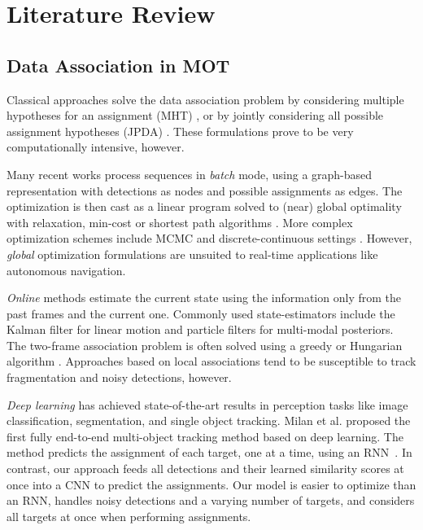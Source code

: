 \documentclass[letterpaper, 10 pt, conference]{ieeeconf}
\begin{document}
\section{Literature Review}
\subsection{Data Association in MOT}
Classical approaches solve the data association problem by considering multiple hypotheses for an assignment (MHT) \cite{mht}, or by jointly considering all possible assignment hypotheses (JPDA) \cite{jpda}. These formulations prove to be very computationally intensive, however. 
\par Many recent works process sequences in \textit{batch} mode, using a graph-based representation with detections as nodes and possible assignments as edges. The optimization is then cast as a linear program solved to (near) global optimality with relaxation, min-cost or shortest path algorithms \cite{relax, flow, path}. More complex optimization schemes include MCMC \cite{mcmc} and discrete-continuous settings \cite{andrienko}. However, \textit{global} optimization formulations are unsuited to real-time applications like autonomous navigation. 
\par \textit{Online} methods estimate the current state using the information only from the past frames and the current one. Commonly used state-estimators include the Kalman filter \cite{kalman} for linear motion and particle filters \cite{particle} for multi-modal posteriors. The two-frame association problem is often solved using a greedy or Hungarian algorithm \cite{hungarian}. Approaches based on local associations tend to be susceptible to track fragmentation and noisy detections, however.

\par \textit{Deep learning} has achieved state-of-the-art results in perception tasks like image classification, segmentation, and single object tracking. Milan et al. proposed the first fully end-to-end multi-object tracking method based on deep learning. The method predicts the assignment of each target, one at a time, using an RNN~\cite{milan}. In contrast, our approach feeds all detections and their learned similarity scores at once into a CNN to predict the assignments. Our model is easier to optimize than an RNN, handles noisy detections and a varying number of targets, and considers all targets at once when performing assignments.
\end{document}
